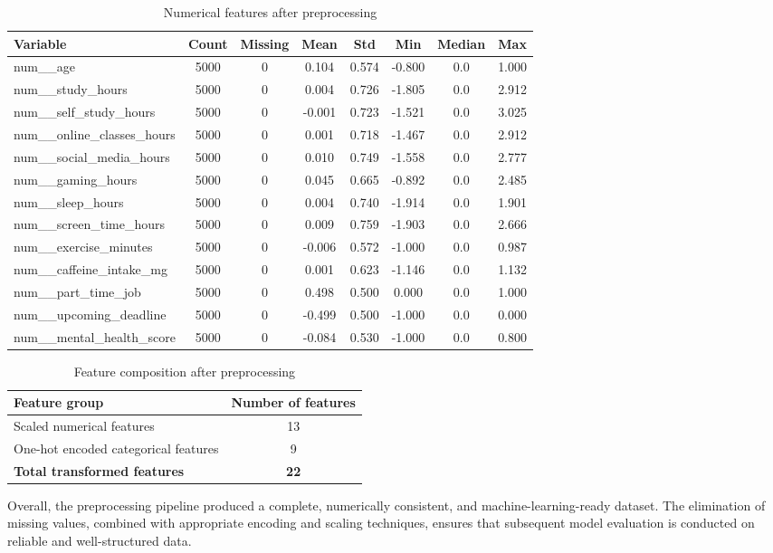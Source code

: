 \begin{table}[t]
\centering
\caption{Numerical features after preprocessing}
\begin{tabular}{lccccccc}
\toprule
\textbf{Variable} & \textbf{Count} & \textbf{Missing} & \textbf{Mean} & \textbf{Std} & \textbf{Min} & \textbf{Median} & \textbf{Max} \\
\midrule
num\_\_age & 5000 & 0 & 0.104 & 0.574 & -0.800 & 0.0 & 1.000 \\
num\_\_study\_hours & 5000 & 0 & 0.004 & 0.726 & -1.805 & 0.0 & 2.912 \\
num\_\_self\_study\_hours & 5000 & 0 & -0.001 & 0.723 & -1.521 & 0.0 & 3.025 \\
num\_\_online\_classes\_hours & 5000 & 0 & 0.001 & 0.718 & -1.467 & 0.0 & 2.912 \\
num\_\_social\_media\_hours & 5000 & 0 & 0.010 & 0.749 & -1.558 & 0.0 & 2.777 \\
num\_\_gaming\_hours & 5000 & 0 & 0.045 & 0.665 & -0.892 & 0.0 & 2.485 \\
num\_\_sleep\_hours & 5000 & 0 & 0.004 & 0.740 & -1.914 & 0.0 & 1.901 \\
num\_\_screen\_time\_hours & 5000 & 0 & 0.009 & 0.759 & -1.903 & 0.0 & 2.666 \\
num\_\_exercise\_minutes & 5000 & 0 & -0.006 & 0.572 & -1.000 & 0.0 & 0.987 \\
num\_\_caffeine\_intake\_mg & 5000 & 0 & 0.001 & 0.623 & -1.146 & 0.0 & 1.132 \\
num\_\_part\_time\_job & 5000 & 0 & 0.498 & 0.500 & 0.000 & 0.0 & 1.000 \\
num\_\_upcoming\_deadline & 5000 & 0 & -0.499 & 0.500 & -1.000 & 0.0 & 0.000 \\
num\_\_mental\_health\_score & 5000 & 0 & -0.084 & 0.530 & -1.000 & 0.0 & 0.800 \\
\bottomrule
\end{tabular}
\end{table}

\begin{table}[h]
\centering
\caption{Feature composition after preprocessing}
\begin{tabular}{lc}
\toprule
\textbf{Feature group} & \textbf{Number of features} \\
\midrule
Scaled numerical features & 13 \\
One-hot encoded categorical features & 9 \\
\midrule
\textbf{Total transformed features} & \textbf{22} \\
\bottomrule
\end{tabular}
\end{table}

Overall, the preprocessing pipeline produced a complete, numerically consistent, and machine-learning-ready dataset. The elimination of missing values, combined with appropriate encoding and scaling techniques, ensures that subsequent model evaluation is conducted on reliable and well-structured data.
